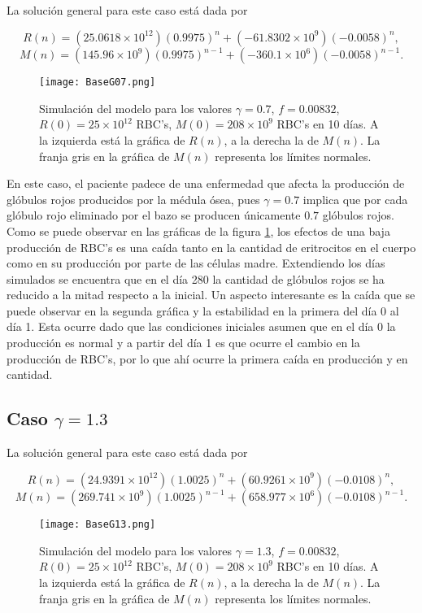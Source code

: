 La solución general para este caso está dada por

$$R(n)=(25.0618\times 10^{12})(0.9975)^n+(-61.8302\times 10^{9})(-0.0058)^n,$$
$$M(n)=(145.96\times 10^{9})(0.9975)^{n-1}+(-360.1\times 10^{6})(-0.0058)^{n-1}.$$


\begin{figure}[H]
    \centering
    \captionsetup{justification=centering}
    \texttt{[image: BaseG07.png]}
    \caption{Simulación del modelo para los valores $\gamma = 0.7$, $f = 0.00832$, $R(0) = 25\times 10^{12}$ RBC's, $M(0) = 208 \times 10^{9}$ RBC's en 10 días. A la izquierda está la gráfica de $R(n)$, a la derecha la de $M(n)$. La franja gris en la gráfica de $M(n)$ representa los límites normales.}
    \label{sec:modelo:fig:G07}
\end{figure}

En este caso, el paciente padece de una enfermedad que afecta la producción de glóbulos rojos producidos por la médula ósea, pues $\gamma=0.7$ implica que por cada glóbulo rojo eliminado por el bazo se producen únicamente $0.7$ glóbulos rojos. Como se puede observar en las gráficas de la figura \ref{sec:modelo:fig:G07}, los efectos de una baja producción de RBC's es una caída tanto en la cantidad de eritrocitos en el cuerpo como en su producción por parte de las células madre. Extendiendo los días simulados se encuentra que en el día 280 la cantidad de glóbulos rojos se ha reducido a la mitad respecto a la inicial. Un aspecto interesante es la caída que se puede observar en la segunda gráfica y la estabilidad en la primera del día 0 al día 1. Esta ocurre dado que las condiciones iniciales asumen que en el día 0 la producción es normal y a partir del día 1 es que ocurre el cambio en la producción de RBC's, por lo que ahí ocurre la primera caída en producción y en cantidad. 

\subsection{Caso $\gamma=1.3$}\label{subsec:modelo:simulaciones:G13}

La solución general para este caso está dada por

$$R(n)=(24.9391\times 10^{12})(1.0025)^n+(60.9261\times 10^{9})(-0.0108)^n,$$
$$M(n)=(269.741\times 10^{9})(1.0025)^{n-1}+(658.977\times 10^{6})(-0.0108)^{n-1}.$$

\begin{figure}[H]
    \centering
    \captionsetup{justification=centering}
    \texttt{[image: BaseG13.png]}
    \caption{Simulación del modelo para los valores $\gamma = 1.3$, $f = 0.00832$, $R(0) = 25\times 10^{12}$ RBC's, $M(0) = 208 \times 10^{9}$ RBC's en 10 días. A la izquierda está la gráfica de $R(n)$, a la derecha la de $M(n)$. La franja gris en la gráfica de $M(n)$ representa los límites normales.}
    \label{sec:modelo:fig:G13}
\end{figure}

